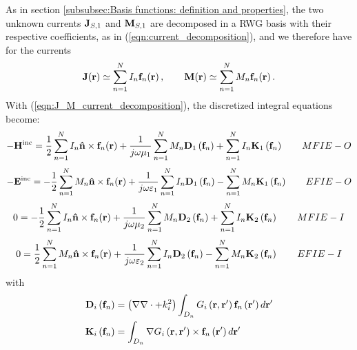As in section \ref{subsubsec:Basis functions: definition and properties}, the two unknown currents $\mathbf{J}_{S, 1}$ and $\mathbf{M}_{S, 1}$ are decomposed in a RWG basis with their respective coefficients, as in (\ref{eqn:current_decomposition}), and we therefore have for the currents 
\begin{equation}\label{eqn:J_M_current_decomposition}
\mathbf{J}\!\left(\mathbf{r}\right) \simeq \sum_{n = 1}^{N} I_n \mathbf{f}_n \!\left(\mathbf{r}\right), \qquad \mathbf{M}\!\left(\mathbf{r}\right) \simeq \sum_{n = 1}^{N} M_n \mathbf{f}_n \!\left(\mathbf{r}\right).
\end{equation}
With (\ref{eqn:J_M_current_decomposition}), the discretized integral equations become:
\begin{equation}
-\mathbf{H}^\text{inc} =  \frac{1}{2} \sum_{n=1}^N I_n \mathbf{\hat{n}} \times \mathbf{f}_n\!\left(\mathbf{r}\right) + \frac{1}{j \omega \mu_1} \sum_{n=1}^{N} M_n \mathbf{D}_1\left(\mathbf{f}_n\right) + \sum_{n=1}^{N} I_n \mathbf{K}_1\left(\mathbf{f}_n\right) \qquad MFIE-O 
\end{equation}
\begin{equation}
-\mathbf{E}^\text{inc} =  -\frac{1}{2} \sum_{n=1}^N M_n \mathbf{\hat{n}} \times \mathbf{f}_n\!\left(\mathbf{r}\right) + \frac{1}{j \omega \varepsilon_1} \sum_{n=1}^{N} I_n \mathbf{D}_1\left(\mathbf{f}_n\right) -  \sum_{n=1}^{N} M_n \mathbf{K}_1\left(\mathbf{f}_n\right) \qquad EFIE-O 
\end{equation}
\begin{equation}
0 =  -\frac{1}{2} \sum_{n=1}^N I_n \mathbf{\hat{n}} \times \mathbf{f}_n\!\left(\mathbf{r}\right) + \frac{1}{j \omega \mu_2} \sum_{n=1}^{N} M_n \mathbf{D}_2\left(\mathbf{f}_n\right) +  \sum_{n=1}^{N} I_n \mathbf{K}_2\left(\mathbf{f}_n\right) \qquad MFIE-I 
\end{equation}
\begin{equation}
0 =  \frac{1}{2} \sum_{n=1}^N M_n \mathbf{\hat{n}} \times \mathbf{f}_n\!\left(\mathbf{r}\right) + \frac{1}{j \omega \varepsilon_2} \sum_{n=1}^{N} I_n \mathbf{D}_2\left(\mathbf{f}_n\right) -  \sum_{n=1}^{N} M_n \mathbf{K}_2\left(\mathbf{f}_n\right) \qquad EFIE-I 
\end{equation}
with
\begin{align*}
\mathbf{D}_i\left(\mathbf{f}_n\right) &= \left(\nabla \nabla \cdot + k_i^2\right) \int_{D_n} G_i\left(\mathbf{r}, \mathbf{r}'\right) \mathbf{f}_n\left(\mathbf{r}'\right) d\mathbf{r}' \\
\mathbf{K}_i\left(\mathbf{f}_n\right) &= \int_{D_n} \nabla G_i\left(\mathbf{r}, \mathbf{r}'\right) \times \mathbf{f}_n\left(\mathbf{r}'\right) d\mathbf{r}'
\end{align*}
